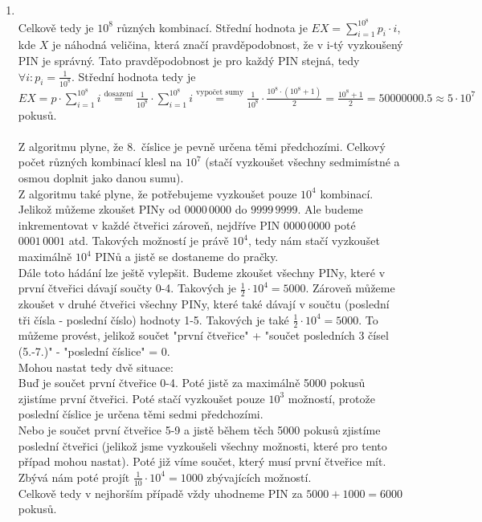 \documentclass[12pt]{article}
\begin{document}
\begin{enumerate}
	
		\item \quad\\
		Celkově tedy je $10^8$ různých kombinací. Střední hodnota je $EX = \sum_{i=1}^{10^8} p_i \cdot i$, kde $X$ je náhodná veličina, která značí pravděpodobnost, že v i-tý vyzkoušený PIN je správný. Tato pravděpodobnost je pro každý PIN stejná, tedy $\forall i : p_i = \frac{1}{10^8} $. Střední hodnota tedy je $EX = p \cdot \sum_{i=1}^{10^8} i \stackrel{\text{dosazení}}{=} \frac{1}{10^8} \cdot \sum_{i=1}^{10^8} i \stackrel{\text{vypočet sumy}}{=} \frac{1}{10^8} \cdot \frac{10^8 \cdot (10^8 +1)}{2} = \frac{10^8+1}{2} = 50000000.5 \approx 5 \cdot 10^7$  pokusů.\\\\
		Z algoritmu plyne, že 8.\ číslice je pevně určena těmi předchozími. Celkový počet různých kombinací klesl na $10^7$ (stačí vyzkoušet všechny sedmimístné a osmou doplnit jako danou sumu).\\
		Z algoritmu také plyne, že potřebujeme vyzkoušet pouze $10^4$ kombinací. Jelikož můžeme zkoušet PINy od $0000\,0000$ do $9999\,9999$. Ale budeme inkrementovat v každé čtveřici zároveň, nejdříve PIN $0000\,0000$ poté $0001\,0001$ atd. Takových možností je právě $10^4$, tedy nám stačí vyzkoušet maximálně $10^4$ PINů a jistě se dostaneme do pračky.\\
		Dále toto hádání lze ještě vylepšit. Budeme zkoušet všechny PINy, které v první čtveřici dávají součty 0-4. Takových je $\frac{1}{2} \cdot 10^4 = 5000$. Zároveň můžeme zkoušet v druhé čtveřici všechny PINy, které také dávají v součtu (poslední tři čísla - poslední číslo) hodnoty 1-5. Takových je také $\frac{1}{2} \cdot 10^4 = 5000$. To můžeme  provést, jelikož součet "první čtveřice" + "součet posledních 3 čísel (5.-7.)" - "poslední číslice" = 0.\\
		Mohou nastat tedy dvě situace:\\
		 Buď je součet první čtveřice 0-4. Poté jistě za maximálně 5000 pokusů zjistíme první čtveřici. Poté stačí vyzkoušet pouze $10^3$ možností, protože poslední číslice je určena těmi sedmi předchozími.\\
		 Nebo je součet první čtveřice 5-9 a jistě během těch 5000 pokusů zjistíme poslední čtveřici (jelikož jsme vyzkoušeli všechny možnosti, které pro tento případ mohou nastat). Poté již víme součet, který musí první čtveřice mít. Zbývá nám poté projít $\frac{1}{10} \cdot 10^4 = 1000$ zbývajících možností.\\
		 Celkově tedy v nejhorším případě vždy uhodneme PIN za $5000+1000=6000$ pokusů. 

\end{enumerate}
\end{document}
